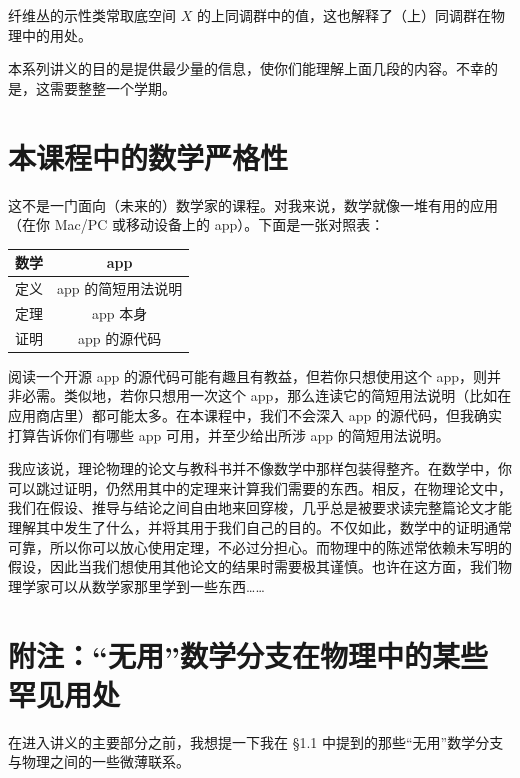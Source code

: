 纤维丛的示性类常取底空间 $X$ 的上同调群中的值，这也解释了（上）同调群在物理中的用处。

本系列讲义的目的是提供最少量的信息，使你们能理解上面几段的内容。不幸的是，这需要整整一个学期。

\section{本课程中的数学严格性}

这不是一门面向（未来的）数学家的课程。对我来说，数学就像一堆有用的应用（在你 Mac/PC 或移动设备上的 app）。下面是一张对照表：

\begin{center}
\begin{tabular}{|c|c|}
\hline
数学 & app \\ \hline
定义 & app 的简短用法说明 \\
定理 & app 本身 \\
证明 & app 的源代码 \\ \hline
\end{tabular}
\end{center}

阅读一个开源 app 的源代码可能有趣且有教益，但若你只想使用这个 app，则并非必需。类似地，若你只想用一次这个 app，那么连读它的简短用法说明（比如在应用商店里）都可能太多。在本课程中，我们不会深入 app 的源代码，但我确实打算告诉你们有哪些 app 可用，并至少给出所涉 app 的简短用法说明。

我应该说，理论物理的论文与教科书并不像数学中那样包装得整齐。在数学中，你可以跳过证明，仍然用其中的定理来计算我们需要的东西。相反，在物理论文中，我们在假设、推导与结论之间自由地来回穿梭，几乎总是被要求读完整篇论文才能理解其中发生了什么，并将其用于我们自己的目的。不仅如此，数学中的证明通常可靠，所以你可以放心使用定理，不必过分担心。而物理中的陈述常依赖未写明的假设，因此当我们想使用其他论文的结果时需要极其谨慎。也许在这方面，我们物理学家可以从数学家那里学到一些东西……


\section{附注：“无用”数学分支在物理中的某些罕见用处}

在进入讲义的主要部分之前，我想提一下我在 §1.1 中提到的那些“无用”数学分支与物理之间的一些微薄联系。

